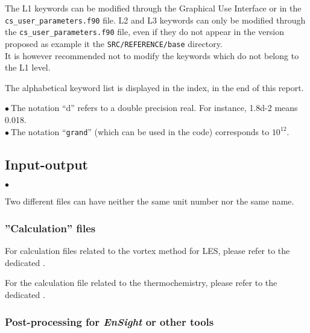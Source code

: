 The L1 keywords can be modified through the Graphical Use Interface or
in the \texttt{cs\_user\_parameters.f90} file. L2 and L3 keywords can only be modified through
the \texttt{cs\_user\_parameters.f90} file, even if they do not appear in the version proposed
as example it the \texttt{SRC/REFERENCE/base} directory.\\
It is however recommended not to modify the keywords which do not belong to the L1
level.

The alphabetical keyword list is displayed in the index, in the end of
this report.

$\bullet\ $The notation ``d'' refers to a double precision real. For
           instance, 1.8d-2 means 0.018. \\
$\bullet\ $The notation ``{\tt grand}'' (which can be used in the code)
corresponds to $10^{12}$.

\subsection{Input-output}

\begin{list}{$\bullet$}{}
\item Two different files can have neither the same unit number nor the
      same name.
\end{list}

\subsubsection{''Calculation'' files}



For calculation files related to the vortex method for LES,
please refer to the dedicated .


For the calculation file related to the thermochemistry, please refer
to the dedicated .

\subsubsection{Post-processing for {\em EnSight} or other tools}

